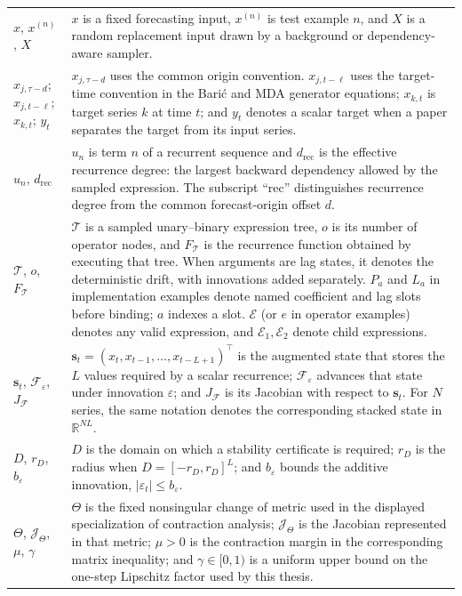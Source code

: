\begin{longtable}{@{}
>{\raggedright\arraybackslash}p{}
>{\raggedright\arraybackslash}p{}@{}}
$x$, $x^{(n)}$, $X$ &
$x$ is a fixed forecasting input, $x^{(n)}$ is test example $n$, and $X$ is a
random replacement input drawn by a background or dependency-aware sampler. \\

$x_{j,\tau-d}$; $x_{j,t-\ell}$; $x_{k,t}$; $y_t$ &
$x_{j,\tau-d}$ uses the common origin convention. $x_{j,t-\ell}$ uses the
target-time convention in the Bari\'c and MDA generator equations;
$x_{k,t}$ is target series $k$ at time $t$; and $y_t$ denotes a scalar target
when a paper separates the target from its input series. \\

$u_n$, $d_{\mathrm{rec}}$ &
$u_n$ is term $n$ of a recurrent sequence and $d_{\mathrm{rec}}$ is the
effective recurrence degree: the largest backward dependency allowed by the
sampled expression. The subscript ``rec'' distinguishes recurrence degree from
the common forecast-origin offset $d$. \\

$\mathcal{T}$, $o$, $F_{\mathcal{T}}$ &
$\mathcal{T}$ is a sampled unary--binary expression tree, $o$ is its number of
operator nodes, and $F_{\mathcal{T}}$ is the recurrence function obtained by
executing that tree. When arguments are lag states, it denotes the
deterministic drift, with innovations added separately. $P_a$ and $L_a$ in
implementation examples denote named coefficient and lag slots before binding;
$a$ indexes a slot. $\mathcal E$ (or $e$ in operator examples) denotes any
valid expression, and $\mathcal E_1,\mathcal E_2$ denote child expressions. \\

$\mathbf{s}_t$, $\mathcal F_{\varepsilon}$, $J_{\mathcal F}$ &
$\mathbf{s}_t=(x_t,x_{t-1},\ldots,x_{t-L+1})^\top$ is the augmented state that
stores the $L$ values required by a scalar recurrence;
$\mathcal F_{\varepsilon}$ advances that state under innovation $\varepsilon$;
and $J_{\mathcal F}$ is its Jacobian with respect to $\mathbf{s}_t$. For $N$
series, the same notation denotes the corresponding stacked state in
$\mathbb R^{NL}$. \\

$D$, $r_D$, $b_{\varepsilon}$ &
$D$ is the domain on which a stability certificate is required; $r_D$ is the
radius when $D=[-r_D,r_D]^L$; and $b_{\varepsilon}$ bounds the additive
innovation, $|\varepsilon_t|\le b_{\varepsilon}$. \\

$\Theta$, $\mathcal J_{\Theta}$, $\mu$, $\gamma$ &
$\Theta$ is the fixed nonsingular change of metric used in the displayed
specialization of contraction analysis; $\mathcal J_{\Theta}$ is the Jacobian represented in
that metric; $\mu>0$ is the contraction margin in the corresponding matrix
inequality; and $\gamma\in[0,1)$ is a uniform upper bound on the one-step
Lipschitz factor used by this thesis. \\


\end{longtable}
